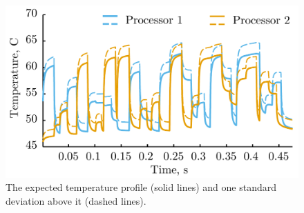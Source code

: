 \begin{figure}[b]
  \vspace{-1.0em}
  \centering
  \includegraphics[width=1\columnwidth]{include/assets/temperature.pdf}
  \caption{The expected temperature profile (solid lines) and one standard deviation above it (dashed lines).}
  \vspace{-1.5em}
\end{figure}
